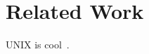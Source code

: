 \section{Related Work}
\label{sec:related}
\FloatBarrier{}

UNIX is cool~\cite{Ritchie:1974:UTS:361011.361061}.
